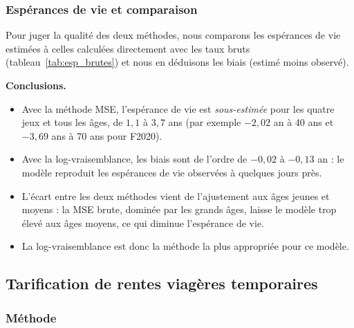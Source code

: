 \documentclass[11pt,a4paper]{article}
\begin{document}
\subsubsection{Espérances de vie et comparaison}



Pour juger la qualité des deux méthodes, nous comparons les espérances de vie estimées à celles calculées directement avec les taux bruts (tableau~\ref{tab:esp_brutes}) et nous en déduisons les biais (estimé moins observé).









\textbf{Conclusions.}
\begin{itemize}
  \item Avec la méthode MSE, l'espérance de vie est \emph{sous-estimée} pour les quatre jeux et tous les âges, de $1{,}1$ à $3{,}7$ ans (par exemple $-2{,}02$ an à 40 ans et $-3{,}69$ ans à 70 ans pour F2020).
  \item Avec la log-vraisemblance, les biais sont de l'ordre de $-0{,}02$ à $-0{,}13$ an : le modèle reproduit les espérances de vie observées à quelques jours près.
  \item L'écart entre les deux méthodes vient de l'ajustement aux âges jeunes et moyens : la MSE brute, dominée par les grands âges, laisse le modèle trop élevé aux âges moyens, ce qui diminue l'espérance de vie.
  \item La log-vraisemblance est donc la méthode la plus appropriée pour ce modèle. %
\end{itemize}

\subsection{Tarification de rentes viagères temporaires}

\subsubsection{Méthode}
\end{document}
